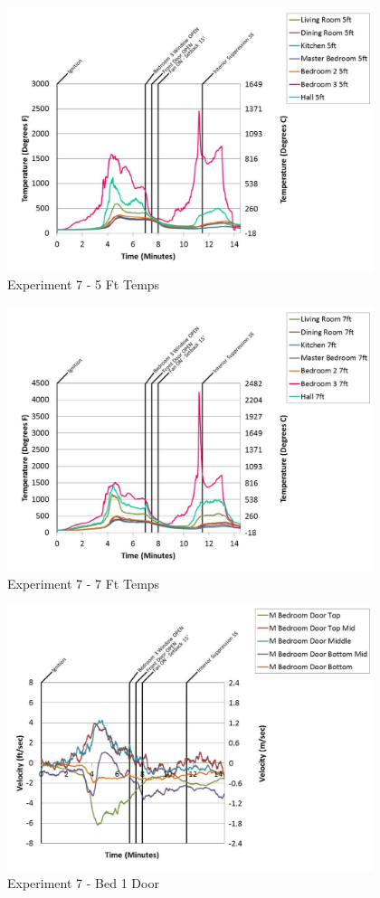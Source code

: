 \documentclass{article}
\begin{document}
\begin{appendices}
	\begin{figure}[h!]
		\centering
		\includegraphics[height=3.05in]{0_Images/Results_Charts/Exp_7_Charts/5FtTemps.pdf}
		\caption{Experiment 7 - 5 Ft Temps}
	\end{figure}
 

	\begin{figure}[h!]
		\centering
		\includegraphics[height=3.05in]{0_Images/Results_Charts/Exp_7_Charts/7FtTemps.pdf}
		\caption{Experiment 7 - 7 Ft Temps}
	\end{figure}
 
	\clearpage

	\begin{figure}[h!]
		\centering
		\includegraphics[height=3.05in]{0_Images/Results_Charts/Exp_7_Charts/Bed1Door.pdf}
		\caption{Experiment 7 - Bed 1 Door}
	\end{figure}
 


\end{appendices}
\end{document}
